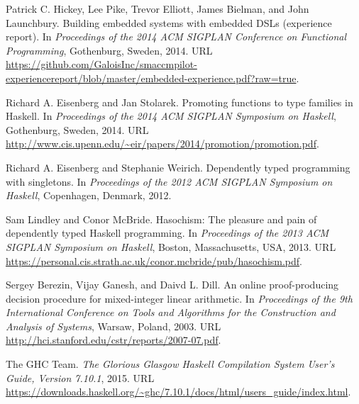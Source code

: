\documentclass{sigplanconf}
\begin{document}
\begin{thebibliography}{}
{Patrick C. Hickey}, {Lee Pike}, {Trevor Elliott}, {James Bielman}, and {John
  Launchbury}.
\newblock Building embedded systems with embedded {DSLs} (experience report).
\newblock In \emph{Proceedings of the 2014 ACM SIGPLAN Conference on Functional
  Programming}, Gothenburg, Sweden, 2014.
\newblock URL
  \url{https://github.com/GaloisInc/smaccmpilot-experiencereport/blob/master/embedded-experience.pdf?raw=true}.

{Richard A. Eisenberg} and {Jan Stolarek}.
\newblock Promoting functions to type families in {Haskell}.
\newblock In \emph{Proceedings of the 2014 ACM SIGPLAN Symposium on {Haskell}},
  Gothenburg, Sweden, 2014.
\newblock URL
  \url{http://www.cis.upenn.edu/~eir/papers/2014/promotion/promotion.pdf}.

{Richard A. Eisenberg} and {Stephanie Weirich}.
\newblock Dependently typed programming with singletons.
\newblock In \emph{Proceedings of the 2012 ACM SIGPLAN Symposium on {Haskell}},
  Copenhagen, Denmark, 2012.

{Sam Lindley} and {Conor McBride}.
\newblock Hasochism: The pleasure and pain of dependently typed {Haskell}
  programming.
\newblock In \emph{Proceedings of the 2013 ACM SIGPLAN Symposium on {Haskell}},
  Boston, Massachusetts, USA, 2013.
\newblock URL
  \url{https://personal.cis.strath.ac.uk/conor.mcbride/pub/hasochism.pdf}.

{Sergey Berezin}, {Vijay Ganesh}, and {Daivd L. Dill}.
\newblock An online proof-producing decision procedure for mixed-integer linear
  arithmetic.
\newblock In \emph{Proceedings of the 9th International Conference on Tools and
  Algorithms for the Construction and Analysis of Systems}, Warsaw, Poland,
  2003.
\newblock URL \url{http://hci.stanford.edu/cstr/reports/2007-07.pdf}.

{The GHC Team}.
\newblock \emph{The Glorious Glasgow Haskell Compilation System User's Guide,
  Version 7.10.1}, 2015.
\newblock URL
  \url{https://downloads.haskell.org/~ghc/7.10.1/docs/html/users_guide/index.html}.

\end{thebibliography}
\end{document}
